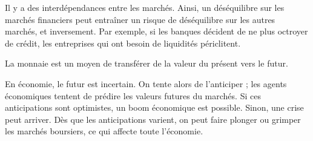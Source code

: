 Il y a des interdépendances entre les marchés. Ainsi, un déséquilibre sur les marchés financiers peut entraîner un risque de déséquilibre sur les autres marchés, et inversement. Par exemple, si les banques décident de ne plus octroyer de crédit, les entreprises qui ont besoin de liquidités périclitent.

La monnaie est un moyen de transférer de la valeur du présent vers le futur.

En économie, le futur est incertain. On tente alors de l'anticiper ; les agents économiques tentent de prédire les valeurs futures du marchés. Si ces anticipations sont optimistes, un boom économique est possible. Sinon, une crise peut arriver. Dès que les anticipations varient, on peut faire plonger ou grimper les marchés boursiers, ce qui affecte toute l'économie.
